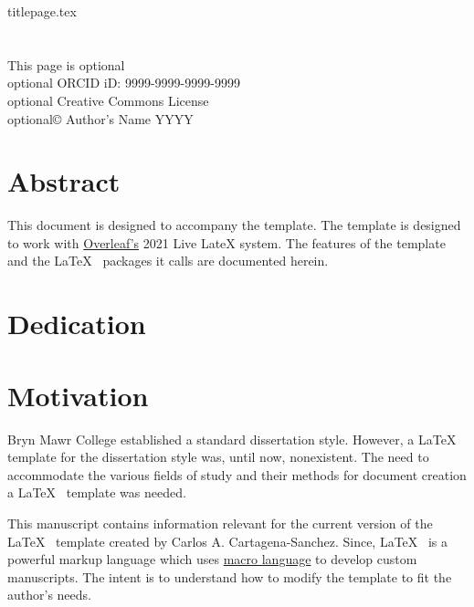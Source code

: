 \documentclass[12pt]{report}
\begin{document}
{titlepage.tex} %
\chapter*{}
\vspace*{\fill}
\begin{center}
\begin{singlespace}
This page is optional\\

optional ORCID iD:  9999-9999-9999-9999\\
optional Creative Commons License \\
optional© Author's Name YYYY\\
\end{singlespace}
\end{center}
\vspace*{\fill}
\chapter*{Abstract}
This document is designed to accompany the template. The template is designed to work with \href{https://www.overleaf.com/for/authors}{Overleaf's} 2021 Live LateX system. The features of the template and the \LaTeX~ packages it calls are documented herein.
\setcounter{page}{2}
\chapter*{Dedication}
\tableofcontents
\newpage
\listoffigures
\newpage
\listoftables
\newpage
\listofappendices
\newpage
{}
\chapter{Motivation}
Bryn Mawr College established a standard dissertation style. However, a \LaTeX~ template for the dissertation style was, until now, nonexistent. The need to accommodate the various fields of study and their methods for document creation a \LaTeX~ template was needed.

This manuscript contains information relevant for the current version of the \LaTeX~ template created by Carlos A. Cartagena-Sanchez. Since, \LaTeX~ is a powerful markup language which uses \href{https://en.wikipedia.org/wiki/LaTeX}{macro language} to develop custom manuscripts. The intent is to understand how to modify the template to fit the author's needs. 

\singlespacing
\printbibliography[heading=bibintoc, title={Bibliography}]
\end{document}
